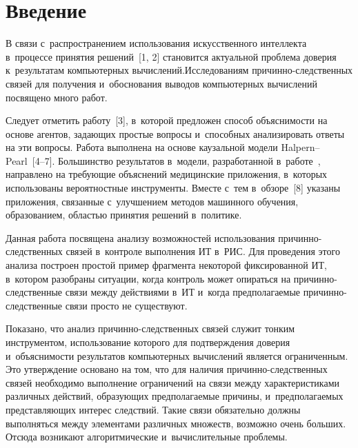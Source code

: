 \begin{multicols}{2}

\label{st\stat}
   
  \section{Введение }
  
  В связи с~распространением использования искусственного интеллекта 
в~процессе принятия решений~[1, 2] становится актуальной проблема доверия 
к~результатам компьютерных вычислений.\linebreak Исследованиям при\-чин\-но-след\-ст\-вен\-ных 
связей для получения и~обоснования выводов компьютерных 
вычислений посвящено много работ.
{

}

 Следует отметить работу~[3], в~которой 
предложен способ объяснимости на основе агентов, задающих простые вопросы 
и~способных анализировать ответы на эти вопросы. Работа выполнена на основе 
каузальной модели Halpern--Pearl~[4--7]. Большинство результатов в~модели, 
разработанной в~работе~\cite{7-gr}, направлено на требующие объяснений 
медицинские приложения, в~которых использованы вероятностные инструменты. 
Вместе с~тем в~обзоре~[8] указаны приложения, связанные с~улучшением методов 
машинного обучения, образованием, об\-ластью принятия решений в~политике.
{

}
  
  Данная работа посвящена анализу возможностей использования  
при\-чин\-но-след\-ствен\-ных связей в~контроле выполнения ИТ в~РИС. Для 
проведения этого анализа построен простой пример фрагмента некоторой 
фиксированной ИТ, в~котором разобраны ситуации, когда контроль может 
опираться на при\-чин\-но-след\-ст\-вен\-ные связи между действиями в~ИТ 
и~когда предполагаемые при\-чин\-но-след\-ст\-вен\-ные связи просто не 
существуют. 


Показано, что анализ при\-чин\-но-след\-ст\-вен\-ных связей служит 
тонким инструментом, использование которого для подтверждения доверия 
и~объяснимости результатов компьютерных вычислений является ограниченным. 
Это утверждение основано на том, что для наличия  
при\-чин\-но-след\-ст\-вен\-ных связей необходимо выполнение ограничений на 
связи между характеристиками различных действий, образующих 
предполагаемые причины, и~предполагаемых представляющих интерес следствий. 
Такие связи обязательно должны выполняться между элементами различных 
множеств, возможно очень больших. Отсюда возникают алгоритмические 
и~вычислительные проб\-лемы.


\end{multicols}
